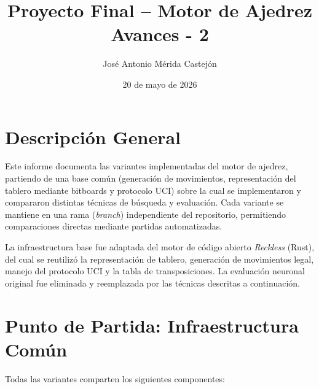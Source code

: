 \documentclass[12pt]{article}
\title{Proyecto Final -- Motor de Ajedrez \\ \small Avances - 2}
\author{José Antonio Mérida Castejón}
\date{20 de mayo de 2026}
\begin{document}
\maketitle

\section{Descripción General}

Este informe documenta las variantes implementadas del motor de ajedrez, partiendo de una base común (generación de movimientos,
representación del tablero mediante bitboards y protocolo UCI) sobre la cual se implementaron y compararon distintas técnicas de
búsqueda y evaluación. Cada variante se mantiene en una rama (\textit{branch}) independiente del repositorio, permitiendo comparaciones
directas mediante partidas automatizadas.

La infraestructura base fue adaptada del motor de código abierto \textit{Reckless} (Rust), del cual se reutilizó la representación
de tablero, generación de movimientos legal, manejo del protocolo UCI y la tabla de transposiciones. La evaluación neuronal original
fue eliminada y reemplazada por las técnicas descritas a continuación.

\section{Punto de Partida: Infraestructura Común}

Todas las variantes comparten los siguientes componentes:
\end{document}
